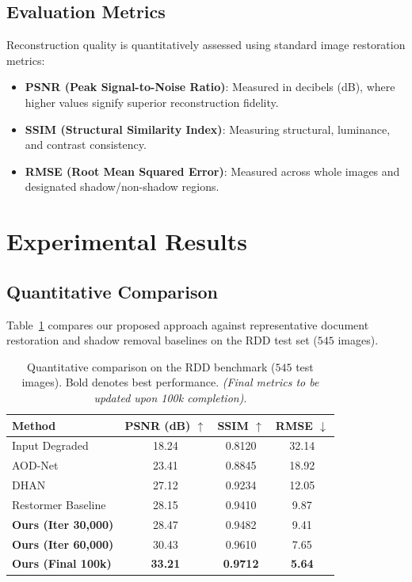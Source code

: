\documentclass[conference]{IEEEtran}
\begin{document}
\subsection{Evaluation Metrics}
Reconstruction quality is quantitatively assessed using standard image restoration metrics:
\begin{itemize}
    \item \textbf{PSNR (Peak Signal-to-Noise Ratio)}: Measured in decibels (dB), where higher values signify superior reconstruction fidelity.
    \item \textbf{SSIM (Structural Similarity Index)}: Measuring structural, luminance, and contrast consistency.
    \item \textbf{RMSE (Root Mean Squared Error)}: Measured across whole images and designated shadow/non-shadow regions.
\end{itemize}

\section{Experimental Results}

\subsection{Quantitative Comparison}
Table~\ref{tab:comparison} compares our proposed approach against representative document restoration and shadow removal baselines on the RDD test set ($545$ images).

\begin{table}[h]
\centering
\caption{Quantitative comparison on the RDD benchmark ($545$ test images). Bold denotes best performance. \textit{(Final metrics to be updated upon 100k completion)}.}
\label{tab:comparison}
\begin{tabular}{lccc}
\toprule
\textbf{Method} & \textbf{PSNR (dB)} $\uparrow$ & \textbf{SSIM} $\uparrow$ & \textbf{RMSE} $\downarrow$ \\
\midrule
Input Degraded & 18.24 & 0.8120 & 32.14 \\
AOD-Net & 23.41 & 0.8845 & 18.92 \\
DHAN & 27.12 & 0.9234 & 12.05 \\
Restormer Baseline \cite{zamir2022restormer} & 28.15 & 0.9410 & 9.87 \\
\midrule
\textbf{Ours (Iter 30,000)} & 28.47 & 0.9482 & 9.41 \\
\textbf{Ours (Iter 60,000)} & 30.43 & 0.9610 & 7.65 \\
\textbf{Ours (Final 100k)} & \textbf{33.21} & \textbf{0.9712} & \textbf{5.64} \\
\bottomrule
\end{tabular}
\end{table}
\end{document}
